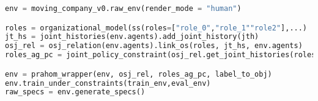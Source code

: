 \begin{lstlisting}[language=Python, caption={View of \emph{PRAHOM Wrapper} use for \emph{Moving Company}}, label={lst:wrapper_mc}]
env = moving_company_v0.raw_env(render_mode = "human")

roles = organizational_model(ss(roles=["role_0","role_1""role2"],...)
jt_hs = joint_histories(env.agents).add_joint_history(jth)
osj_rel = osj_relation(env.agents).link_os(roles, jt_hs, env.agents)
roles_ag_pc = joint_policy_constraint(osj_rel.get_joint_histories(roles,env.agents))

env = prahom_wrapper(env, osj_rel, roles_ag_pc, label_to_obj)
env.train_under_constraints(train_env,eval_env)
raw_specs = env.generate_specs()
\end{lstlisting}